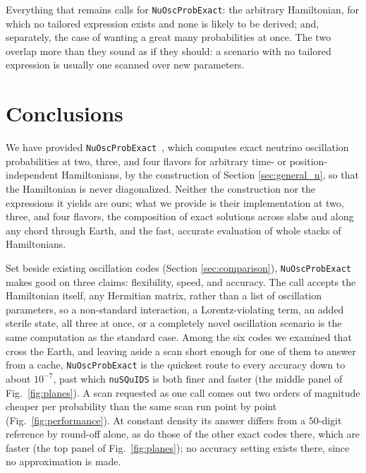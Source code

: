 \documentclass[final,5p,times,twocolumn,sort,compress]{elsarticle}
\newcommand{\fig}{Fig.}
\newcommand{\figu}[1]{\fig~\ref{fig:#1}}
\begin{document}
Everything that remains calls for {\tt NuOscProbExact}: the arbitrary Hamiltonian, for which no tailored expression exists and none is likely to be derived; and, separately, the case of wanting a great many probabilities at once.  The two overlap more than they sound as if they should: a scenario with no tailored expression is usually one scanned over new parameters.


\section{Conclusions}
\label{sec:conclusions}

We have provided {\tt NuOscProbExact}\ \cite{NuOscProbExact}, which computes exact neutrino oscillation probabilities at two, three, and four flavors for arbitrary time- or position-independent Hamiltonians, by the construction of Section \ref{sec:general_n}, so that the Hamiltonian is never diagonalized.  Neither the construction nor the expressions it yields are ours; what we provide is their implementation at two, three, and four flavors, the composition of exact solutions across slabs and along any chord through Earth, and the fast, accurate evaluation of whole stacks of Hamiltonians.

Set beside existing oscillation codes (Section \ref{sec:comparison}), {\tt NuOscProbExact} makes good on three claims: flexibility, speed, and accuracy.  The call accepts the Hamiltonian itself, any Hermitian matrix, rather than a list of oscillation parameters, so a non-standard interaction, a Lorentz-violating term, an added sterile state, all three at once, or a completely novel oscillation scenario is the same computation as the standard case.  Among the six codes we examined that cross the Earth, and leaving aside a scan short enough for one of them to answer from a cache, {\tt NuOscProbExact} is the quickest route to every accuracy down to about $10^{-7}$, past which {\tt nuSQuIDS} is both finer and faster (the middle panel of \figu{planes}).  A scan requested as one call comes out two orders of magnitude cheaper per probability than the same scan run point by point (\figu{performance}).  At constant density its answer differs from a $50$-digit reference by round-off alone, as do those of the other exact codes there, which are faster (the top panel of \figu{planes}); no accuracy setting exists there, since no approximation is made.
\end{document}
